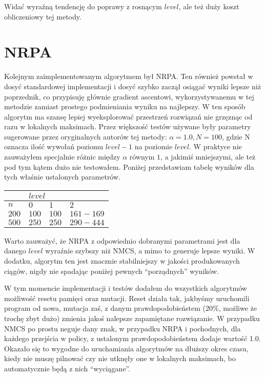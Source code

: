 \documentclass[a4paper,10pt]{article}
\begin{document}
Widać wyraźną tendencję do poprawy z rosnącym $level$, ale też duży koszt obliczeniowy tej metody.

\section{NRPA}
Kolejnym zaimplementowanym algorytmem był NRPA. Ten również powstał w dosyć standardowej implementacji i dosyć szybko zaczął osiągać wyniki
lepsze niż poprzednik, co przypisuję głównie gradient ascentowi, wykorzystywanemu w tej metodzie zamiast prostego podmieniania wyniku na
najlepszy. W ten sposób algorytm ma szansę lepiej wyeksplorować przestrzeń rozwiązań nie grzęznąc od razu w lokalnych maksimach. Przez większość
testów używane były parametry sugerowane przez oryginalnych autorów tej metody: $\alpha = 1.0, N = 100$, gdzie N oznacza ilość wywołań poziomu 
$level - 1$ na poziomie $level$. W praktyce nie zauważyłem specjalnie różnic między $\alpha$ równym $1$, a jakimiś mniejszymi, ale też pod tym
kątem dużo nie testowałem. Poniżej przedstawiam tabelę wyników dla tych właśnie ustalonych parametrów.

\begin{adjustbox}{center}
\begin{tabularx}{0.7\linewidth}{|X|X|X|X| }
  \hline
  & \multicolumn{3}{|X|}{$level$} \\
  \hline
  $n$ & $0$ & $1$ & $2$ \\
  \hline
  $200$ & $100$ & $100$ & $161-169$ \\
  \hline
  $500$ & $250$ & $250$ & $290-444$ \\
  \hline
\end{tabularx}
\end{adjustbox}

Warto zauważyć, że NRPA z odpowiednio dobranymi parametrami jest dla danego $level$ wyraźnie szybszy niż NMCS, a mimo to generuje lepsze wyniki.
W dodatku, algorytm ten jest znacznie stabilniejszy w jakości produkowanych ciągów, nigdy nie spadając poniżej pewnych ``porządnych'' wyników.

W tym momencie implementacji i testów dodałem do wszystkich algorytmów możliwość resetu pamięci oraz mutacji. Reset działa tak, jakbyśmy
uruchomili program od nowa, mutacja zaś, z danym prawdopodobieństem ($20\%$, możliwe że trochę zbyt dużo) zmienia jakoś nalepsze zapamiętane
rozwiązanie. W przypadku NMCS po prostu neguje dany znak, w przypadku NRPA i pochodnych, dla każdego przejścia w policy, z ustalonym 
prawdopodobieństem dodaje wartość 1.0. Okazało się to wygodne do uruchamiania algorytmów na dłuższy okres czasu, kiedy nie muszę pilnować
czy nie utknęły one w lokalnych maksimach, bo automatycznie będą z nich ``wyciągane''.
\end{document}
